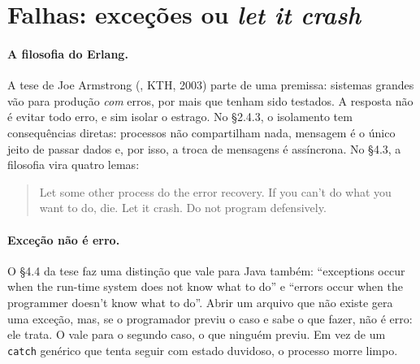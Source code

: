 \section{Falhas: exceções ou \emph{let it crash}}
\label{sec:vms-falhas}

\paragraph{A filosofia do Erlang.}
A tese de Joe Armstrong (,
KTH, 2003) parte de uma premissa: sistemas grandes vão para produção
\emph{com} erros, por mais que tenham sido testados. A resposta não é
evitar todo erro, e sim isolar o estrago. No §2.4.3, o isolamento
tem consequências diretas: processos não compartilham nada, mensagem é o
único jeito de passar dados e, por isso, a troca de mensagens é
assíncrona. No §4.3, a filosofia vira quatro lemas:
\begin{quote}
Let some other process do the error recovery. If you can't do what you
want to do, die. Let it crash. Do not program defensively.
\end{quote}

\paragraph{Exceção não é erro.}
O §4.4 da tese faz uma distinção que vale para Java também:
\enquote{exceptions occur when the run-time system does not know what to
do} e \enquote{errors occur when the programmer doesn't know what to do}.
Abrir um arquivo que não existe gera uma exceção, mas, se o programador
previu o caso e sabe o que fazer, não é erro: ele trata. O
 vale para o
segundo caso, o que ninguém previu. Em vez de um \texttt{catch} genérico
que tenta seguir com estado duvidoso, o processo morre limpo.

